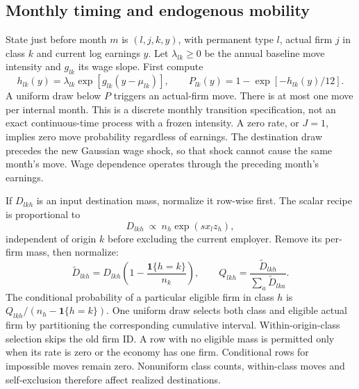 \documentclass[11pt,letterpaper]{article}
\begin{document}
\subsection{Monthly timing and endogenous mobility}
State just before month $m$ is $(l,j,k,y)$, with permanent type $l$, actual firm
$j$ in class $k$ and current log earnings $y$. Let $\lambda_{lk}\geq0$ be the
annual baseline move intensity and $g_{lk}$ its wage slope. First compute
\begin{equation}
 h_{lk}(y)=\lambda_{lk}\exp[g_{lk}(y-\mu_{lk})],\qquad
 P_{lk}(y)=1-\exp[-h_{lk}(y)/12].
\label{eq:blmmove}
\end{equation}
A uniform draw below $P$ triggers an actual-firm move. There is at most one
move per internal month. This is a discrete monthly transition specification,
not an exact continuous-time process with a frozen intensity. A zero rate, or
$J=1$, implies zero move probability regardless of earnings. The destination
draw precedes the new Gaussian wage shock, so that shock cannot cause the same
month's move. Wage dependence operates through the preceding month's earnings.

If $D_{lkh}$ is an input destination mass, normalize it row-wise first.
The scalar recipe is proportional to
\[
 D_{lkh}\ \propto\ n_h\exp(s x_l z_h),
\]
independent of origin $k$ before excluding the current employer. Remove its
per-firm mass, then normalize:
\[
 \widetilde D_{lkh}=D_{lkh}\left(1-\frac{\mathbf1\{h=k\}}{n_k}\right),
 \qquad Q_{lkh}=\frac{\widetilde D_{lkh}}{\sum_a\widetilde D_{lka}}.
\]
The conditional probability of a particular eligible firm in class $h$ is
$Q_{lkh}/(n_h-\mathbf1\{h=k\})$. One uniform draw selects both class and
eligible actual firm by partitioning the corresponding cumulative interval.
Within-origin-class selection skips the old firm ID. A row with no eligible
mass is permitted only when its rate is zero or the economy has one firm.
Conditional rows for impossible moves remain zero. Nonuniform class counts,
within-class moves and self-exclusion therefore affect realized destinations.
\end{document}
